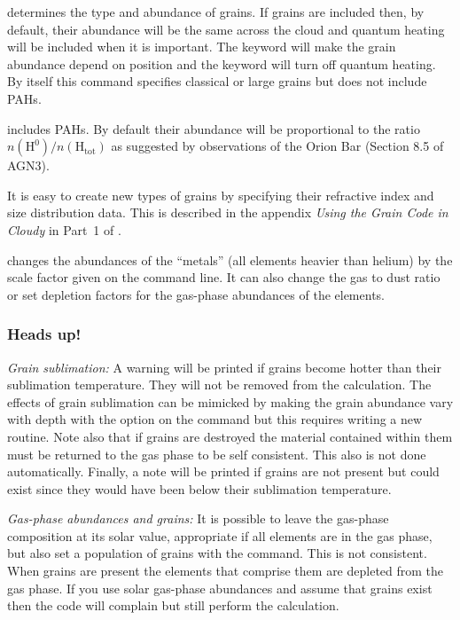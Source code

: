 \documentclass[12pt,twoside]{article}
\begin{document}
 determines the type
\label{command:grains}
and abundance of grains.  If grains are
included then, by default, their abundance will be the same across the cloud
and quantum heating will be included when it is important.   The
keyword will make the grain abundance depend on position and the
keyword will turn off quantum heating.  By itself this command specifies
classical or large grains but does not include PAHs.

 includes PAHs.  By default
their abundance will be proportional
to the ratio $n(\mathrm{H}^0)/n(\mathrm{H}_\mathrm{tot})$
as suggested by observations of the Orion Bar (Section 8.5 of AGN3).

It is easy to create new types of grains by specifying their refractive index
and size distribution data.
This is described in the appendix \emph{Using the Grain Code in Cloudy} in Part~1 of \Hazy.

 changes the abundances
\label{command:metals}
of the ``metals'' (all elements heavier
than helium) by the scale factor given on the command line.  It can also
change the gas to dust ratio or set depletion factors for the gas-phase
abundances of the elements.

\subsubsection{Heads up!}

\emph{Grain sublimation:} A warning will be printed if grains become hotter
than their sublimation temperature.  They will not be removed from the
calculation.  The effects of grain sublimation can be mimicked by making
the grain abundance vary with depth with the
 option on the 
command but this requires writing a new routine.  Note also that if grains
are destroyed the material contained within them must be returned to the
gas phase to be self consistent.  This also is not done automatically.
Finally, a note will be printed if grains are not present but could exist
since they would have been below their sublimation temperature.

\emph{Gas-phase abundances and grains:}
It is possible to leave the gas-phase
composition at its solar value, appropriate if all elements are in the gas
phase, but also set a population of grains
with the  command.  This
is not consistent.  When grains are present the elements that comprise them
are depleted from the gas phase.  If you use solar gas-phase abundances
and assume that grains exist then the code will complain but still perform
the calculation.
\end{document}
